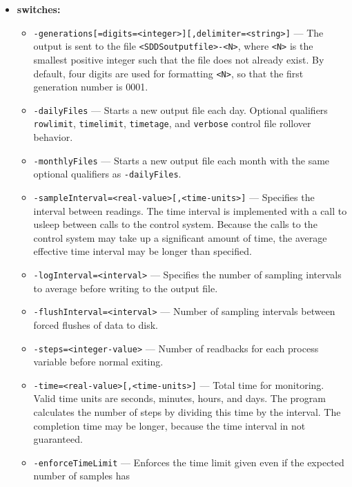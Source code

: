 \begin{itemize}
%
\item {\bf switches:}
%
%
    \begin{itemize}
%
%
        \item {\verb+-generations[=digits=<integer>][,delimiter=<string>]+} ---
                The output is sent to the file \verb+<SDDSoutputfile>-<N>+, where \verb+<N>+ is
                the smallest positive integer such that the file does not already
                exist.  By default, four digits are used for formatting \verb+<N>+, so that
                the first generation number is 0001.
        \item {\tt -dailyFiles} --- Starts a new output file each day. Optional qualifiers
                \verb+rowlimit+, \verb+timelimit+, \verb+timetage+, and \verb+verbose+ control
                file rollover behavior.
        \item {\tt -monthlyFiles} --- Starts a new output file each month with the same optional
                qualifiers as \verb+-dailyFiles+.
        \item {\tt -sampleInterval=<real-value>[,<time-units>]} --- Specifies the interval between readings. The time
                interval is implemented with a call to usleep between calls to the control system.
                Because the calls to the control system may take up a significant amount of time, the average
                effective time interval may be longer than specified. 
        \item {\tt -logInterval=<interval>} --- Specifies the number of sampling intervals to average before
                writing to the output file.
        \item {\tt -flushInterval=<interval>} --- Number of sampling intervals between forced flushes of data to disk.
        \item {\tt -steps=<integer-value>} --- Number of readbacks for each process variable before normal exiting.
        \item {\tt -time=<real-value>[,<time-units>]} --- Total time for monitoring. Valid time units are
                seconds, minutes, hours, and days. The program calculates the number of steps by dividing this time
                by the interval. The completion time may be longer, because the time interval in not guaranteed.
        \item {\tt -enforceTimeLimit} --- Enforces the time limit given even if the expected number of samples has

\end{itemize}
\end{itemize}

